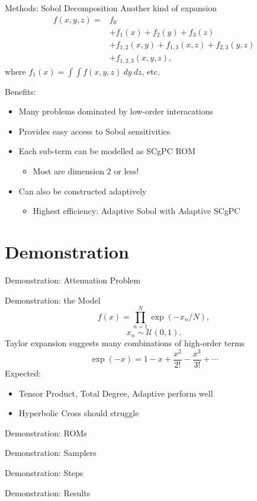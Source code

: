 \documentclass[t,9pt,svgnames]{beamer}
\begin{document}
\begin{frame}{Methods: Sobol Decomposition}
  Another kind of expansion
  \begin{align*}
    f(x,y,z) =& f_0 \\
             &+ f_1(x) + f_2(y) + f_3(z)\\
             &+ f_{1,2}(x,y) + f_{1,3}(x,z) + f_{2,3}(y,z) \\
             &+ f_{1,2,3}(x,y,z),
  \end{align*}
  where $f_1(x)=\int\int f(x,y,z)\ dy\ dz$, etc.

  Benefits:
  \begin{itemize}
    \item Many problems dominated by low-order interacations
    \item Provides easy access to Sobol sensitivities
    \item Each sub-term can be modelled as SCgPC ROM
    \begin{itemize}
      \item Most are dimension 2 or less!
    \end{itemize}
    \item Can also be constructed adaptively
    \begin{itemize}
      \item Highest efficiency: Adaptive Sobol with Adaptive SCgPC
    \end{itemize}
  \end{itemize}
\end{frame}
%
%
\section{Demonstration}
\begin{frame}{Demonstration: Attenuation Problem}
\end{frame}

\begin{frame}{Demonstration: the Model}
  \begin{equation}
    f(x) = \prod_{n=1}^N \exp(-x_n/N),
  \end{equation}
  \begin{equation}
    x_n \sim \mathcal{U}(0,1).
  \end{equation}
  Taylor expansion suggests many combinations of high-order terms
  \begin{equation}
    \exp(-x) = 1-x+\frac{x^2}{2!}-\frac{x^3}{3!}+\cdots
  \end{equation}
  Expected: 
  \begin{itemize}
    \item Tensor Product, Total Degree, Adaptive perform well
    \item Hyperbolic Cross should struggle
  \end{itemize}
\end{frame}

\begin{frame}{Demonstration: ROMs}
\end{frame}

\begin{frame}{Demonstration: Samplers}
\end{frame}

\begin{frame}{Demonstration: Steps}
\end{frame}

\begin{frame}{Demonstration: Results}
\end{frame}
\end{document}
